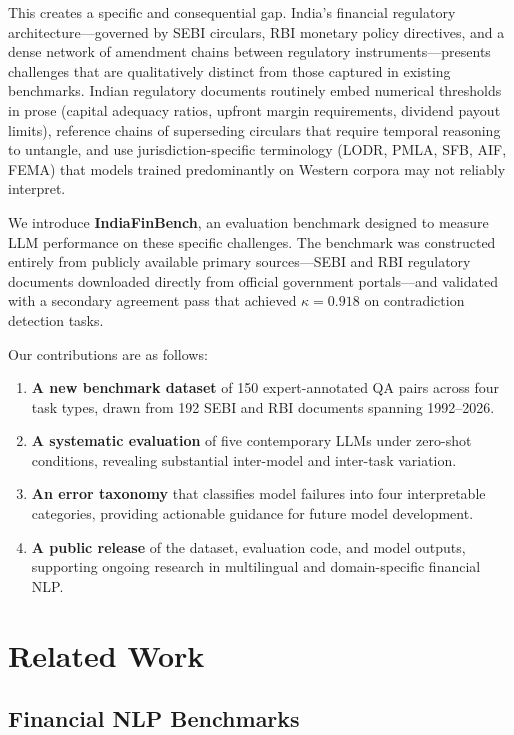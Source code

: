 \documentclass[11pt]{article}
\begin{document}
This creates a specific and consequential gap. India's financial regulatory
architecture---governed by SEBI circulars, RBI monetary policy directives, and
a dense network of amendment chains between regulatory
instruments---presents challenges that are qualitatively distinct from those
captured in existing benchmarks. Indian regulatory documents routinely embed
numerical thresholds in prose (capital adequacy ratios, upfront margin
requirements, dividend payout limits), reference chains of superseding
circulars that require temporal reasoning to untangle, and use
jurisdiction-specific terminology (LODR, PMLA, SFB, AIF, FEMA) that models
trained predominantly on Western corpora may not reliably interpret.

We introduce \textbf{IndiaFinBench}, an evaluation benchmark designed to
measure LLM performance on these specific challenges. The benchmark was
constructed entirely from publicly available primary sources---SEBI and RBI
regulatory documents downloaded directly from official government
portals---and validated with a secondary agreement pass that achieved
$\kappa = 0.918$ on contradiction detection tasks.

Our contributions are as follows:

\begin{enumerate}
  \item \textbf{A new benchmark dataset} of 150 expert-annotated QA pairs
    across four task types, drawn from 192 SEBI and RBI documents spanning
    1992--2026.
  \item \textbf{A systematic evaluation} of five contemporary LLMs under
    zero-shot conditions, revealing substantial inter-model and inter-task
    variation.
  \item \textbf{An error taxonomy} that classifies model failures into four
    interpretable categories, providing actionable guidance for future model
    development.
  \item \textbf{A public release} of the dataset, evaluation code, and model
    outputs, supporting ongoing research in multilingual and domain-specific
    financial NLP.
\end{enumerate}

\section{Related Work}

\subsection{Financial NLP Benchmarks}
\end{document}
